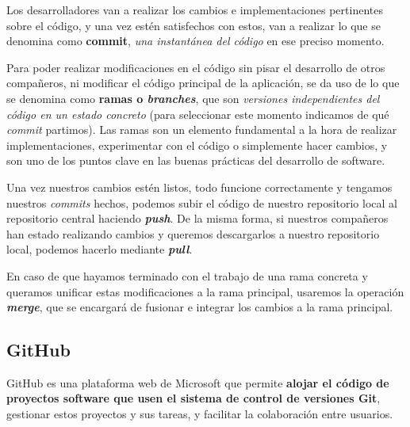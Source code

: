 
Los desarrolladores van a realizar los cambios e implementaciones pertinentes sobre el código, y una vez estén satisfechos con estos, van a realizar lo que se denomina como \textbf{commit}, \textit{una instantánea del código} en ese preciso momento.


Para poder realizar modificaciones en el código sin pisar el desarrollo de otros compañeros, ni modificar el código principal de la aplicación, se da uso de lo que se denomina como \textbf{ramas o \textit{branches}}, que son \textit{versiones independientes del código en un estado concreto} (para seleccionar este momento indicamos de qué \textit{commit} partimos). Las ramas son un elemento fundamental a la hora de realizar implementaciones, experimentar con el código o simplemente hacer cambios, y son uno de los puntos clave en las buenas prácticas del desarrollo de software.


Una vez nuestros cambios estén listos, todo funcione correctamente y tengamos nuestros \textit{commits} hechos, podemos subir el código de nuestro repositorio local al repositorio central haciendo \textit{\textbf{push}}. De la misma forma, si nuestros compañeros han estado realizando cambios y queremos descargarlos a nuestro repositorio local, podemos hacerlo mediante \textit{\textbf{pull}}.

En caso de que hayamos terminado con el trabajo de una rama concreta y queramos unificar estas modificaciones a la rama principal, usaremos la operación \textit{\textbf{merge}}, que se encargará de fusionar e integrar los cambios a la rama principal. \cite{git:git-basics}


\subsection{GitHub}

GitHub es una plataforma web de Microsoft que permite \textbf{alojar el código de proyectos software que usen el sistema de control de versiones Git}, gestionar estos proyectos y sus tareas, y facilitar la colaboración entre usuarios.

